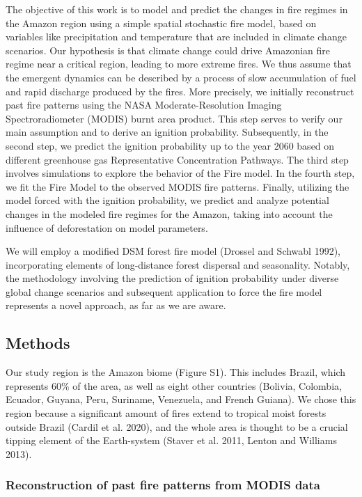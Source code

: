 \documentclass[
]{article}
\begin{document}
The objective of this work is to model and predict the changes in fire
regimes in the Amazon region using a simple spatial stochastic fire
model, based on variables like precipitation and temperature that are
included in climate change scenarios. Our hypothesis is that climate
change could drive Amazonian fire regime near a critical region, leading
to more extreme fires. We thus assume that the emergent dynamics can be
described by a process of slow accumulation of fuel and rapid discharge
produced by the fires. More precisely, we initially reconstruct past
fire patterns using the NASA Moderate-Resolution Imaging
Spectroradiometer (MODIS) burnt area product. This step serves to verify
our main assumption and to derive an ignition probability. Subsequently,
in the second step, we predict the ignition probability up to the year
2060 based on different greenhouse gas Representative Concentration
Pathways. The third step involves simulations to explore the behavior of
the Fire model. In the fourth step, we fit the Fire Model to the
observed MODIS fire patterns. Finally, utilizing the model forced with
the ignition probability, we predict and analyze potential changes in
the modeled fire regimes for the Amazon, taking into account the
influence of deforestation on model parameters.

We will employ a modified DSM forest fire model (Drossel and Schwabl
1992), incorporating elements of long-distance forest dispersal and
seasonality. Notably, the methodology involving the prediction of
ignition probability under diverse global change scenarios and
subsequent application to force the fire model represents a novel
approach, as far as we are aware.

\subsection{Methods}\label{methods}

Our study region is the Amazon biome (Figure S1). This includes Brazil,
which represents 60\% of the area, as well as eight other countries
(Bolivia, Colombia, Ecuador, Guyana, Peru, Suriname, Venezuela, and
French Guiana). We chose this region because a significant amount of
fires extend to tropical moist forests outside Brazil (Cardil et al.
2020), and the whole area is thought to be a crucial tipping element of
the Earth-system (Staver et al. 2011, Lenton and Williams 2013).

\subsubsection{Reconstruction of past fire patterns from MODIS
data}\label{reconstruction-of-past-fire-patterns-from-modis-data}
\end{document}

